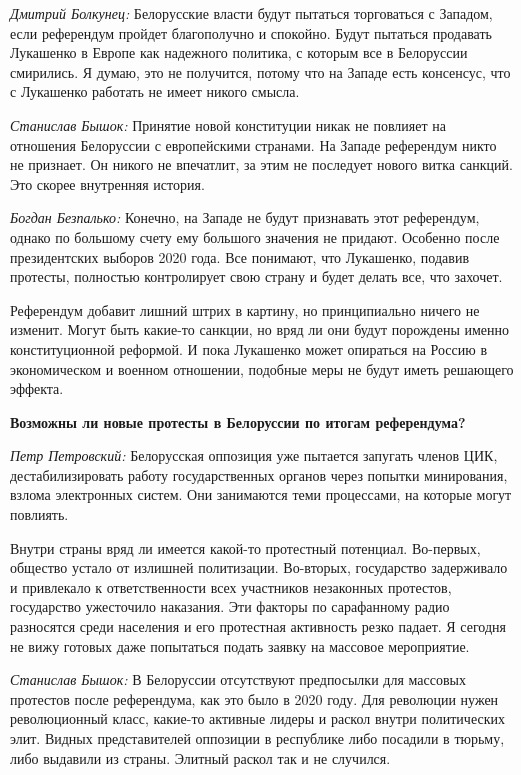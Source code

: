 \textit{Дмитрий Болкунец:} Белорусские власти будут пытаться торговаться с Западом, если референдум пройдет благополучно и спокойно. Будут пытаться продавать Лукашенко в Европе как надежного политика, с которым все в Белоруссии смирились. Я думаю, это не получится, потому что на Западе есть консенсус, что с Лукашенко работать не имеет никого смысла.

\textit{Станислав Бышок:} Принятие новой конституции никак не повлияет на отношения Белоруссии с европейскими странами. На Западе референдум никто не признает. Он никого не впечатлит, за этим не последует нового витка санкций. Это скорее внутренняя история.

\textit{Богдан Безпалько:} Конечно, на Западе не будут признавать этот референдум, однако по большому счету ему большого значения не придают. Особенно после президентских выборов 2020 года. Все понимают, что Лукашенко, подавив протесты, полностью контролирует свою страну и будет делать все, что захочет.

Референдум добавит лишний штрих в картину, но принципиально ничего не изменит. Могут быть какие-то санкции, но вряд ли они будут порождены именно конституционной реформой. И пока Лукашенко может опираться на Россию в экономическом и военном отношении, подобные меры не будут иметь решающего эффекта.

\textbf{Возможны ли новые протесты в Белоруссии по итогам референдума?}

\textit{Петр Петровский:} Белорусская оппозиция уже пытается запугать членов ЦИК, дестабилизировать работу государственных органов через попытки минирования, взлома электронных систем. Они занимаются теми процессами, на которые могут повлиять.

Внутри страны вряд ли имеется какой-то протестный потенциал. Во-первых, общество устало от излишней политизации. Во-вторых, государство задерживало и привлекало к ответственности всех участников незаконных протестов, государство ужесточило наказания. Эти факторы по сарафанному радио разносятся среди населения и его протестная активность резко падает. Я сегодня не вижу готовых даже попытаться подать заявку на массовое мероприятие.

\textit{Станислав Бышок:} В Белоруссии отсутствуют предпосылки для массовых протестов после референдума, как это было в 2020 году. Для революции нужен революционный класс, какие-то активные лидеры и раскол внутри политических элит. Видных представителей оппозиции в республике либо посадили в тюрьму, либо выдавили из страны. Элитный раскол так и не случился.

